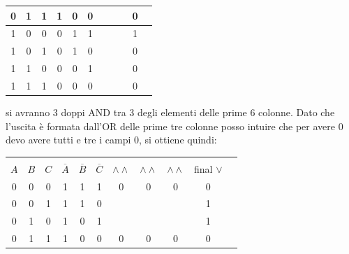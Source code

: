 \documentclass[a4paper,12pt, oneside]{book}
\begin{document}
\begin{esercizio}
\begin{center}
\begin{tabular}{|c|c|c|c|c|c|c|c|c|c|c|}
      \hline
      0   & 1   & 1   & 1              & 0              & 0              &                  &                  &                 & 0            \\
      \hline
      1   & 0   & 0   & 0              & 1              & 1              &                  &                  &                 & 1            \\
      \hline
      1   & 0   & 1   & 0              & 1              & 0              &                  &                  &                 & 0            \\
      \hline
      1   & 1   & 0   & 0              & 0              & 1              &                  &                  &                 & 0            \\
      \hline
      1   & 1   & 1   & 0              & 0              & 0              &                  &                  &                 & 0            \\
      \hline
    \end{tabular}
  \end{center}
  si avranno 3 doppi AND tra 3 degli elementi delle prime 6 colonne. Dato che l'uscita è formata dall'OR delle prime tre colonne posso intuire che per avere 0 devo avere tutti e tre i campi 0, si ottiene quindi:
  \begin{center}
    \begin{tabular}{|c|c|c|c|c|c|c|c|c|c|c|}
      \hline
      &     &     &                &                &                &                  &                  &                 &              \\
      $A$ & $B$ & $C$ & $\overline{A}$ & $\overline{B}$ & $\overline{C}$ & $\wedge \wedge $ & $\wedge \wedge $ & $\wedge \wedge$ & final $\vee$ \\
      \hline
      0   & 0   & 0   & 1              & 1              & 1              & 0                & 0                & 0               & 0            \\
      \hline
      0   & 0   & 1   & 1              & 1              & 0              &                  &                  &                 & 1            \\
      \hline
      0   & 1   & 0   & 1              & 0              & 1              &                  &                  &                 & 1            \\
      \hline
      0   & 1   & 1   & 1              & 0              & 0              & 0                & 0                & 0               & 0            \\

\end{tabular}
\end{center}
\end{esercizio}
\end{document}
